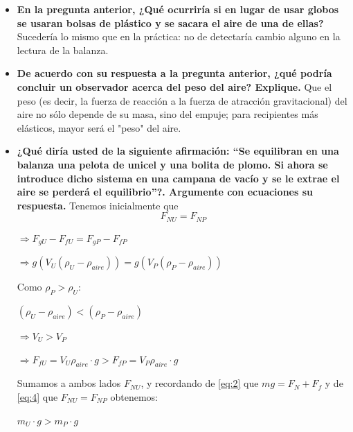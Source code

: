 \documentclass[12pt]{article}
\begin{document}
\begin{itemize}
{dos globos inflados en los extremos de un balancín, se pinchó un globo y se observó
el resultado. ¿Usted qué opina?}
   Es algo como lo que se realizó en la práctica; sin embargo, el resultado de la práctica es debido a más factores que sólo el peso del globo, por lo que relacionar directamente lo que sucedió en el programa de televisión con la existencia del peso del aire no sería recomendable.
    \item \textbf{En la pregunta anterior, ¿Qué ocurriría si en lugar de usar globos se usaran bolsas de plástico y se sacara el aire de una de ellas?}
    Sucedería lo mismo que en la práctica: no de detectaría cambio alguno en la lectura de la balanza.
    \item \textbf{De acuerdo con su respuesta a la pregunta anterior, ¿qué podría concluir un observador acerca del peso del aire? Explique.}
    Que el peso (es decir, la fuerza de reacción a la fuerza de atracción gravitacional) del aire no sólo depende de su masa, sino del empuje; para recipientes más elásticos, mayor será el "peso" del aire.
    \item \textbf{¿Qué diría usted de la siguiente afirmación: “Se equilibran en una balanza una
    pelota de unicel y una bolita de plomo. Si ahora se introduce dicho sistema en una
    campana de vacío y se le extrae el aire se perderá el equilibrio”?. Argumente con ecuaciones su respuesta.}
    Tenemos inicialmente que 
   \begin{equation} \label{eq:4}
       F_{NU}=F_{NP}
   \end{equation}
         \begin{center}
      
        $\Rightarrow F_{gU}-F_{fU}=F_{gP}-F_{fP}$
       
       $\Rightarrow g(V_{U}(\rho_{U}-\rho_{aire}))=g(V_{P}(\rho_{P}-\rho_{aire}))$
    \end{center}
    Como $\rho_{P} > \rho_{U}$:
    \begin{center}
        $(\rho_{U}-\rho_{aire})<(\rho_{P}-\rho_{aire})$
        
        $\Rightarrow V_{U}>V_{P}$
    
        $\Rightarrow F_{fU}=V_{U}\rho_{aire}\cdot g>F_{fP}=V_{P}\rho_{aire}\cdot g$
    \end{center}
    Sumamos a ambos lados $F_{NU}$, y recordando de \ref{eq:2} que $mg=F_{N}+F_{f}$ y de \ref{eq:4} que $F_{NU}=F_{NP}$ obtenemos:
    \begin{center}
        $m_{U}\cdot g>m_{P}\cdot g$
        

\end{center}
\end{itemize}
\end{document}
